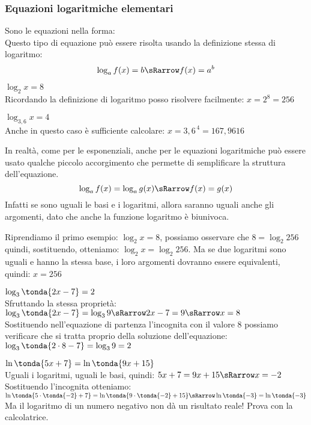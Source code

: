 \subsubsection{Equazioni logaritmiche elementari}
\label{subsubsec:esplog_eq_log_elementari}

\noindent Sono le equazioni nella forma: \quad {} 
\\[7pt]
Questo tipo di equazione può essere risolta usando la definizione stessa di 
logaritmo:
\[\log_a{f(x)} = b \sRarrow f(x)=a^b\]
\begin{esempio}
 \(\log_2{x} = 8\)\\[4pt] 
 Ricordando la definizione di logaritmo posso risolvere facilmente: \; \(x 
= 2^8 = 256\)
\end{esempio}
\begin{esempio}
 \(\log_{3,6}{x} = 4\)\\[4pt]
 Anche in questo caso è sufficiente calcolare: \quad \( x = 3,6^{\,4} = 
167,9616\)
\end{esempio}

In realtà, come per le esponenziali, anche per le equazioni logaritmiche 
può essere usato qualche piccolo
accorgimento che permette di semplificare la struttura dell'equazione.
\[\log_a{f(x)} = \log_a{g(x)} \sRarrow f(x) = g(x)\]
Infatti se sono uguali le basi e i logaritmi, allora saranno uguali anche 
gli argomenti, dato che anche la funzione logaritmo è biunivoca.

\begin{esempio}
 Riprendiamo il primo esempio: \(\log_2{x} = 8\), possiamo osservare che 
 \(8 = \log_2{256}\) quindi, sostituendo, 
 otteniamo: \(\log_2{x} = \log_2{256}\). Ma se due logaritmi sono uguali e 
hanno la stessa base, i loro argomenti dovranno essere equivalenti, quindi:
\(x = 256\)
\end{esempio}

\begin{esempio}
 \(\log_{3}\tonda{2x-7} = 2 \)\\[4pt]
 Sfruttando la stessa proprietà: 
 \(\log_{3}\tonda{2x-7} = \log_{3}9 \sRarrow  
2x -7 = 9 \sRarrow x = 8\)
\\[4pt] 
Sostituendo nell'equazione di partenza l'incognita con il valore 8 
possiamo verificare che si tratta proprio della soluzione dell'equazione:
\(\log_{3}\tonda{2 \cdot 8-7} = \log_{3} 9 = 2\)
\end{esempio}

\begin{esempio}
 \(\ln\tonda{5x +7} = \ln\tonda{9x +15}\) \\[4pt]
 Uguali i logaritmi, uguali le basi, quindi:
 \(5x +7 = 9x +15  \sRarrow x = -2\) \\[4pt]
Sostituendo l'incognita otteniamo:
 \(\ln\tonda{5 \cdot \tonda{-2} +7} = 
   \ln\tonda{9 \cdot \tonda{-2} +15} \sRarrow 
   \ln\tonda{-3} = \ln\tonda{-3}\) \\[4pt]
 Ma il logaritmo di un numero negativo non dà un risultato reale! Prova con 
la calcolatrice.
\end{esempio}

